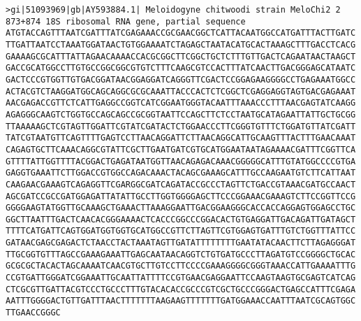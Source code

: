 \documentclass[11pt]{article}
\begin{document}
\begin{Verbatim}[commandchars=\\\{\}]
>gi|51093969|gb|AY593884.1| Meloidogyne chitwoodi strain MeloChi2 2 873+874 18S ribosomal RNA gene, partial sequence
ATGTACCAGTTTAATCGATTTATCGAGAAACCGCGAACGGCTCATTACAATGGCCATGATTTACTTGATC
TTGATTAATCCTAAATGGATAACTGTGGAAAATCTAGAGCTAATACATGCACTAAAGCTTTGACCTCACG
GAAAAGCGCATTTATTAGAACAAAACCACGCGGCTTCGGCTGCTCTTTGTTGACTCAGAATAACTAAGCT
GACCGCATGGCCTTGTGCCGGCGGCGTGTCTTTCAAGCGTCCACTTTATCAACTTGACGGGAGCATAATC
GACTCCCGTGGTTGTGACGGATAACGGAGGATCAGGGTTCGACTCCGGAGAAGGGGCCTGAGAAATGGCC
ACTACGTCTAAGGATGGCAGCAGGCGCGCAAATTACCCACTCTCGGCTCGAGGAGGTAGTGACGAGAAAT
AACGAGACCGTTCTCATTGAGGCCGGTCATCGGAATGGGTACAATTTAAACCCTTTAACGAGTATCAAGG
AGAGGGCAAGTCTGGTGCCAGCAGCCGCGGTAATTCCAGCTTCTCCTAATGCATAGAATTATTGCTGCGG
TTAAAAAGCTCGTAGTTGGATTCGTATCGATACTCTGGAACCCTTCGGGTGTTTCTGGATGTTATCGATT
TATCGTAATGTTCAGTTTTGAGTCCTTAACAGGATTCTTAACAGGCATTGCAAGTTTACTTTGAACAAAT
CAGAGTGCTTCAAACAGGCGTATTCGCTTGAATGATCGTGCATGGAATAATAGAAAACGATTTCGGTTCA
GTTTTATTGGTTTTACGGACTGAGATAATGGTTAACAGAGACAAACGGGGGCATTTGTATGGCCCCGTGA
GAGGTGAAATTCTTGGACCGTGGCCAGACAAACTACAGCGAAAGCATTTGCCAAGAATGTCTTCATTAAT
CAAGAACGAAAGTCAGAGGTTCGARGGCGATCAGATACCGCCCTAGTTCTGACCGTAAACGATGCCAACT
AGCGATCCGCCGATGGAGATTATATTGCCTTGGTGGGGAGCTTCCCGGAAACGAAAGTCTTCCGGTTCCG
GGGGAAGTATGGTTGCAAAGCTGAAACTTAAAGGAATTGACGGAAGGGCACCACCAGGAGTGGAGCCTGC
GGCTTAATTTGACTCAACACGGGAAAACTCACCCGGCCCGGACACTGTGAGGATTGACAGATTGATAGCT
TTTTCATGATTCAGTGGATGGTGGTGCATGGCCGTTCTTAGTTCGTGGAGTGATTTGTCTGGTTTATTCC
GATAACGAGCGAGACTCTAACCTACTAAATAGTTGATATTTTTTTTGAATATACAACTTCTTAGAGGGAT
TTGCGGTGTTTAGCCGAAAGAAATTGAGCAATAACAGGTCTGTGATGCCCTTAGATGTCCGGGGCTGCAC
GCGCGCTACACTAGCAAAATCAACGTGCTTGTCCTTCCCCGAAAGGGGCGGGTAAACCATTGAAAATTTG
CCGTGATTGGGATCGGAAATTGCAATTATTTTCCGTGAACGAGGAATTCCAAGTAAGTGCGAGTCATCAG
CTCGCGTTGATTACGTCCCTGCCCTTTGTACACACCGCCCGTCGCTGCCCGGGACTGAGCCATTTCGAGA
AATTTGGGGACTGTTGATTTAACTTTTTTTAAGAAGTTTTTTTGATGGAAACCAATTTAATCGCAGTGGC
TTGAACCGGGC


\end{Verbatim}
\end{document}
